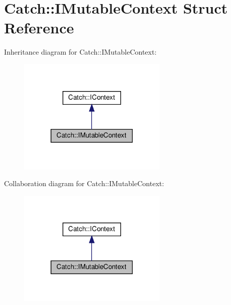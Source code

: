 \hypertarget{structCatch_1_1IMutableContext}{}\section{Catch\+:\+:I\+Mutable\+Context Struct Reference}
\label{structCatch_1_1IMutableContext}


Inheritance diagram for Catch\+:\+:I\+Mutable\+Context\+:\nopagebreak
\begin{figure}[H]
\begin{center}
\leavevmode
\includegraphics[width=201pt]{structCatch_1_1IMutableContext__inherit__graph}
\end{center}
\end{figure}


Collaboration diagram for Catch\+:\+:I\+Mutable\+Context\+:\nopagebreak
\begin{figure}[H]
\begin{center}
\leavevmode
\includegraphics[width=201pt]{structCatch_1_1IMutableContext__coll__graph}
\end{center}
\end{figure}
